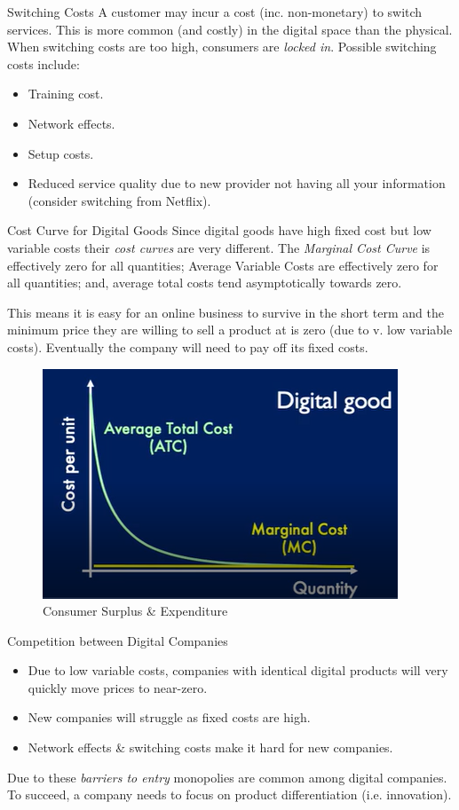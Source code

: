 \documentclass[11pt,a4paper]{article}
\begin{document}
\begin{remark}{Switching Costs}
  A customer may incur a cost (inc. non-monetary) to switch services. This is more common (and costly) in the digital space than the physical. When switching costs are too high, consumers are \textit{locked in}. Possible switching costs include:
  \begin{itemize}
    \item Training cost.
    \item Network effects.
    \item Setup costs.
    \item Reduced service quality due to new provider not having all your information (consider switching from Netflix).
  \end{itemize}
\end{remark}

\begin{proposition}{Cost Curve for Digital Goods}
  Since digital goods have high fixed cost but low variable costs their \textit{cost curves} are very different. The \textit{Marginal Cost Curve} is effectively zero for all quantities; Average Variable Costs are effectively zero for all quantities; and, average total costs tend asymptotically towards zero.
  \par This means it is easy for an online business to survive in the short term and the minimum price they are willing to sell a product at is zero (due to v. low variable costs). Eventually the company will need to pay off its fixed costs.
\end{proposition}

\begin{figure}[ht!]
  \centering
  \includegraphics[width=.5\textwidth]{digitalCostCurve.PNG}
  \caption{Consumer Surplus \& Expenditure}
\end{figure}

\begin{remark}{Competition between Digital Companies}
  \begin{itemize}
    \item Due to low variable costs, companies with identical digital products will very quickly move prices to near-zero.
    \item New companies will struggle as fixed costs are high.
    \item Network effects \& switching costs make it hard for new companies.
  \end{itemize}
  Due to these \textit{barriers to entry} monopolies are common among digital companies. To succeed, a company needs to focus on product differentiation (i.e. innovation).
\end{remark}
\end{document}

